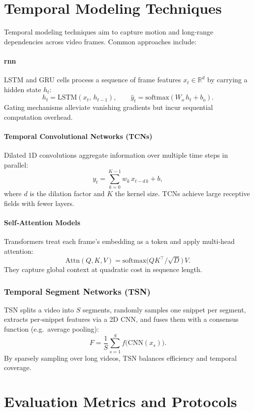 \section{Temporal Modeling Techniques} %
\label{sec:temporal_models}

Temporal modeling techniques aim to capture motion and long‐range dependencies across video frames. Common approaches include:

\paragraph{\acrfull{rnn}}  
LSTM and GRU cells process a sequence of frame features \(x_t\in\mathbb{R}^d\) by carrying a hidden state \(h_t\):
\[
h_t = \mathrm{LSTM}(x_t,\,h_{t-1}), 
\qquad
\hat y_t = \mathrm{softmax}(W_o\,h_t + b_o).
\]
Gating mechanisms alleviate vanishing gradients but incur sequential computation overhead.

\paragraph{Temporal Convolutional Networks (TCNs)}  
Dilated 1D convolutions aggregate information over multiple time steps in parallel:
\[
y_t = \sum_{k=0}^{K-1} w_k\,x_{t - d\,k} + b,
\]
where \(d\) is the dilation factor and \(K\) the kernel size. TCNs achieve large receptive fields with fewer layers.

\paragraph{Self‐Attention Models}  
Transformers treat each frame’s embedding as a token and apply multi‐head attention:
\[
\mathrm{Attn}(Q,K,V) = \mathrm{softmax}\bigl(QK^\top/\sqrt{D}\bigr)\,V.
\]
They capture global context at quadratic cost in sequence length.

\subsubsection{Temporal Segment Networks (TSN)}  
TSN splits a video into \(S\) segments, randomly samples one snippet per segment, extracts per‐snippet features via a 2D CNN, and fuses them with a consensus function (e.g.\ average pooling):
\[
F = \frac{1}{S}\sum_{s=1}^{S}f\bigl(\mathrm{CNN}(x_s)\bigr).
\]
By sparsely sampling over long videos, TSN balances efficiency and temporal coverage.

\section{Evaluation Metrics and Protocols}
\label{sec:evaluation}

